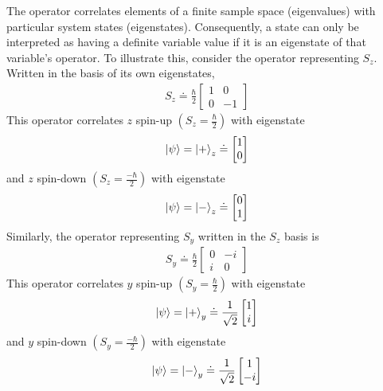 The operator correlates elements of a finite sample space (eigenvalues) with particular system states (eigenstates). Consequently, a state can only be interpreted as having a definite variable value if it is an eigenstate of that variable's operator. To illustrate this, consider the operator representing $S_z$. Written in the basis of its own eigenstates,
\begin{align}
    S_z \doteq \frac{\hbar}{2}\begin{bmatrix} 1 & 0 \\ 0 & -1 \end{bmatrix}
\end{align}
This operator correlates $z$ spin-up $\left(S_z = \frac{\hbar}{2}\right)$ with eigenstate
\begin{align}
    \ket{\psi} = \ket{+}_z \doteq \begin{bmatrix} 1 \\ 0 \end{bmatrix}
\end{align}
and $z$ spin-down $\left(S_z = \frac{-\hbar}{2}\right)$ with eigenstate
\begin{align}
    \ket{\psi} = \ket{-}_z \doteq \begin{bmatrix} 0 \\ 1 \end{bmatrix}
\end{align}
Similarly, the operator representing $S_y$ written in the $S_z$ basis is
\begin{align}
        S_y \doteq \frac{\hbar}{2}\begin{bmatrix} 0 & -i \\ i & 0 \end{bmatrix}
\end{align}
This operator correlates $y$ spin-up $\left(S_y = \frac{\hbar}{2}\right)$ with eigenstate
\begin{align}
    \ket{\psi} = \ket{+}_y \doteq \frac{1}{\sqrt{2}}\begin{bmatrix} 1 \\ i \end{bmatrix}
\end{align}
and $y$ spin-down $\left(S_y = \frac{-\hbar}{2}\right)$ with eigenstate
\begin{align}
    \ket{\psi} = \ket{-}_y \doteq \frac{1}{\sqrt{2}}\begin{bmatrix} 1 \\ -i \end{bmatrix}
\end{align}

